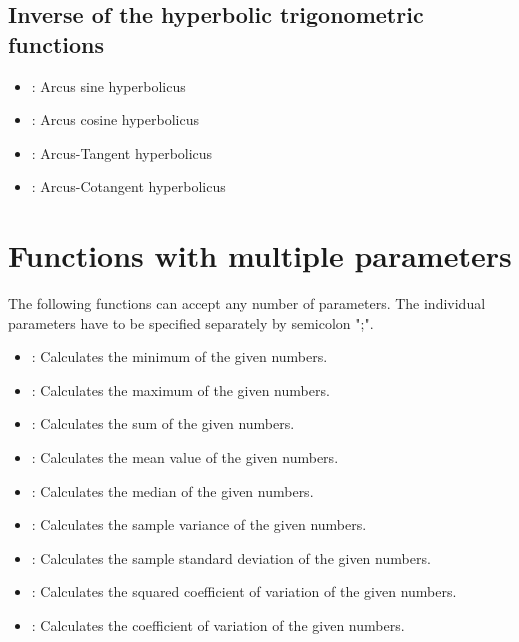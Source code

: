 \section{Inverse of the hyperbolic trigonometric functions}

\begin{itemize}

\item
{}:
Arcus sine hyperbolicus

\item
{}:
Arcus cosine hyperbolicus

\item
{}:
Arcus-Tangent hyperbolicus

\item
{}:
Arcus-Cotangent hyperbolicus

\end{itemize}



\chapter{Functions with multiple parameters}

The following functions can accept any number of parameters.
The individual parameters have to be specified separately by semicolon ";".

\begin{itemize}

\item
{}:
Calculates the minimum of the given numbers.

\item
{}:
Calculates the maximum of the given numbers.

\item
{}:
Calculates the sum of the given numbers.

\item
{}:
Calculates the mean value of the given numbers.

\item
{}:
Calculates the median of the given numbers.

\item
{}:
Calculates the sample variance of the given numbers.

\item
{}:
Calculates the sample standard deviation of the given numbers.

\item
{}:
Calculates the squared coefficient of variation of the given numbers.

\item
{}:
Calculates the coefficient of variation of the given numbers.

\end{itemize}



